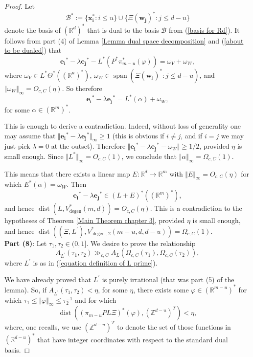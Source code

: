 \documentclass[12pt,a4paper,twoside,reqno]{amsart}
\newcommand{\degen}{\operatorname{degen}}
\newcommand{\dist}{\operatorname{dist}}
\newcommand{\spn}{\operatorname{span}}
\numberwithin{equation}{section}
\begin{document}
\begin{proof}
Let 
\begin{equation}
\label{funky dual basis}
\mathcal{B}^* := \{ \mathbf{x_i^*}: i\leqslant u\} \cup \{\Xi(\mathbf{w_j})^*: j\leqslant d-u\}
\end{equation} denote the basis of $(\mathbb{R}^d)^*$ that is dual to the basis $\mathcal{B}$ from (\ref{basis for Rd}). It follows from part (4) of Lemma \ref{Lemma dual space decomposition} and (\ref{about to be dualed}) that \[\mathbf{e_i}^* - \lambda\mathbf{e_j}^* - L^*(P^* \pi_{m-u}^*(\varphi)) = \omega_V + \omega_W,\] where $\omega_V \in L^* \Theta^*((\mathbb{R}^u)^*)$, $\omega_W \in \spn(\Xi(\mathbf{w_j})^*:j\leqslant d-u)$, and $\Vert\omega_W\Vert_\infty = O_{c,C}(\eta)$. So therefore \[ \mathbf{e_i}^* - \lambda\mathbf{e_j}^* = L^*(\alpha) + \omega_W,\] for some $\alpha \in (\mathbb{R}^m)^*$. 

This is enough to derive a contradiction. Indeed, without loss of generality one may assume that $\Vert \mathbf{e_i}^* - \lambda\mathbf{e_j}^*\Vert_\infty \geqslant 1$ (this is obvious if $i\neq j$, and if $i = j$ we may just pick $\lambda = 0$ at the outset). Therefore $\Vert \mathbf{e_i}^* - \lambda\mathbf{e_j}^* - \omega_W\Vert \geqslant 1/2$, provided $\eta$ is small enough. Since $\Vert L^*\Vert_\infty = O_{c,C}(1)$, we conclude that $\Vert \alpha\Vert_\infty = \Omega_{c,C}(1)$. 

This means that there exists a linear map $E:\mathbb{R}^d \longrightarrow \mathbb{R}^m$ with $\Vert E \Vert_\infty = O_{c,C}(\eta)$ for which $E^*(\alpha) = \omega_W$. Then \[ \mathbf{e_i}^* - \lambda\mathbf{e_j}^* \in (L+E)^*((\mathbb{R}^{m})^*),\] and hence $\dist(L, V_{\degen}^*(m,d)) = O_{c,C}(\eta)$. This is a contradiction to the hypotheses of Theorem \ref{Main Theorem chapter 3}, provided $\eta$ is small enough, and hence $\dist((\Xi,L^\prime),V_{\degen,2}^*(m-u,d,d-u)) = \Omega_{c,C}(1)$. \\

\textbf{Part (8)}: Let $\tau_1,\tau_2 \in (0,1]$. We desire to prove the relationship 
\begin{equation}
\label{claim of part 8}
A_{L^\prime}(\tau_1,\tau_2) \gg_{c,C} A_L(\Omega_{c,C}(\tau_1),\Omega_{c,C}(\tau_2)),
\end{equation}
\noindent where $L^\prime$ is as in (\ref{equation definition of L prime}).

We have already proved that $L^\prime$ is purely irrational (that was part (5) of the lemma). So, if $A_{L^\prime}(\tau_1,\tau_2)  <\eta$, for some $\eta$, there exists some $\varphi \in (\mathbb{R}^{m-u})^*$ for which $ \tau_1\leqslant \Vert \varphi\Vert_\infty \leqslant \tau_2^{-1}$ and for which \[\dist( (\pi_{m-u} PL\Xi)^*(\varphi),(\mathbb{Z}^{d-u})^T) <\eta,\] where, one recalls, we use $(\mathbb{Z}^{d-u})^T$ to denote the set of those functions in $(\mathbb{R}^{d-u})^*$ that have integer coordinates with respect to the standard dual basis. 


\end{proof}
\end{document}
